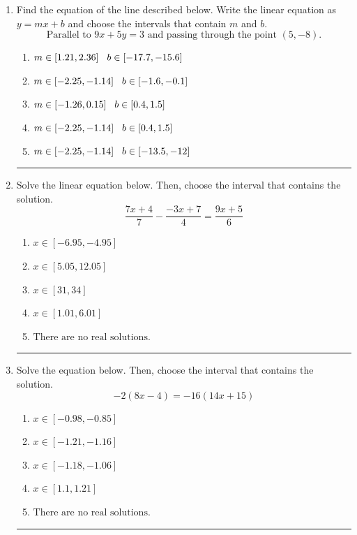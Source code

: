 \documentclass[14pt]{extbook}
\newcommand{\litem}[1]{\item#1\hspace*{-1cm}\rule{\textwidth}{0.4pt}}
\begin{document}
\begin{enumerate}
{\begin{enumerate}[label=\Alph*.]
\end{enumerate} }
\litem{
Find the equation of the line described below. Write the linear equation as $ y=mx+b $ and choose the intervals that contain $m$ and $b$.\[ \text{Parallel to } 9 x + 5 y = 3 \text{ and passing through the point } (5, -8). \]\begin{enumerate}[label=\Alph*.]
\item \( m \in [1.21, 2.36] \hspace*{3mm} b \in [-17.7, -15.6] \)
\item \( m \in [-2.25, -1.14] \hspace*{3mm} b \in [-1.6, -0.1] \)
\item \( m \in [-1.26, 0.15] \hspace*{3mm} b \in [0.4, 1.5] \)
\item \( m \in [-2.25, -1.14] \hspace*{3mm} b \in [0.4, 1.5] \)
\item \( m \in [-2.25, -1.14] \hspace*{3mm} b \in [-13.5, -12] \)

\end{enumerate} }
\litem{
Solve the linear equation below. Then, choose the interval that contains the solution.\[ \frac{7x + 4}{7} - \frac{-3x + 7}{4} = \frac{9x + 5}{6} \]\begin{enumerate}[label=\Alph*.]
\item \( x \in [-6.95, -4.95] \)
\item \( x \in [5.05, 12.05] \)
\item \( x \in [31, 34] \)
\item \( x \in [1.01, 6.01] \)
\item \( \text{There are no real solutions.} \)

\end{enumerate} }
\litem{
Solve the equation below. Then, choose the interval that contains the solution.\[ -2(8x -4) = -16(14x + 15) \]\begin{enumerate}[label=\Alph*.]
\item \( x \in [-0.98, -0.85] \)
\item \( x \in [-1.21, -1.16] \)
\item \( x \in [-1.18, -1.06] \)
\item \( x \in [1.1, 1.21] \)
\item \( \text{There are no real solutions.} \)

\end{enumerate} }
\end{enumerate}
\end{document}
